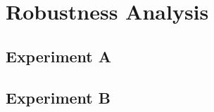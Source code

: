 \chapter{Robustness Analysis}
\label{Chapter-Robustness-Analysis}

\section{Experiment A}
\section{Experiment B}
